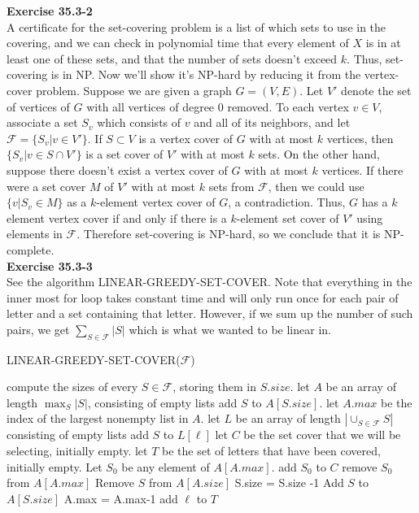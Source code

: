 \documentclass{article}
\begin{document}
\noindent\textbf{Exercise 35.3-2}\\

A certificate for the set-covering problem is a list of which sets to use in the covering, and we can check in polynomial time that every element of $X$ is in at least one of these sets, and that the number of sets doesn't exceed $k$.  Thus, set-covering is in NP.  Now we'll show it's NP-hard by reducing it from the vertex-cover problem.  Suppose we are given a graph $G = (V,E)$.  Let $V'$ denote the set of vertices of $G$ with all vertices of degree 0 removed.  To each vertex $v \in V$, associate a set $S_v$ which consists of $v$ and all of its neighbors, and let $\mathscr{F} = \{ S_v | v \in V'\}$.  If $S \subset V$ is a vertex cover of $G$ with at most $k$ vertices, then $\{S_v | v \in S \cap V'\}$ is a set cover of $V'$ with at most $k$ sets.  On the other hand, suppose there doesn't exist a vertex cover of $G$ with at most $k$ vertices.  If there were a set cover $M$ of $V'$ with at most $k$ sets from $\mathscr{F}$, then we could use $\{v | S_v \in M\}$ as a $k$-element vertex cover of $G$, a contradiction.  Thus, $G$ has a $k$ element vertex cover if and only if there is a $k$-element set cover of $V'$ using elements in $\mathscr{F}$.  Therefore set-covering is NP-hard, so we conclude that it is NP-complete. \\

\noindent\textbf{Exercise 35.3-3}\\

See the algorithm LINEAR-GREEDY-SET-COVER. Note that everything in the inner most for loop takes constant time and will only run once for each pair of letter and a set containing that letter. However, if we sum up the number of such pairs, we get $\sum_{S\in\mathcal{F}} |S|$ which is what we wanted to be linear in.

\begin{algorithm}
\caption{LINEAR-GREEDY-SET-COVER($\mathcal{F}$)}
\begin{algorithmic}
\State compute the sizes of every $S\in \mathcal{F}$, storing them in $S.size$.
\State let $A$ be an array of length $\max_S |S|$, consisting of empty lists
\State add $S$ to $A[S.size]$.
\EndFor
\State let $A.max$ be the index of the largest nonempty list in $A$.
\State let $L$ be an array of length $|\cup_{S\in\mathcal{F}} S|$ consisting of empty lists
\State add $S$ to $L[\ell]$
\EndFor
\EndFor
\State let $C$ be the set cover that we will be selecting, initially empty.
\State let $T$ be the set of letters that have been covered, initially empty.
\State Let $S_0$ be any element of $A[A.max]$.
\State add $S_0$ to $C$
\State remove $S_0$ from $A[A.max]$
\State Remove $S$ from $A[A.size]$
\State S.size = S.size -1
\State Add $S$ to $A[S.size]$
\State A.max = A.max-1
\EndIf
\EndFor
\State add $\ell$ to $T$
\EndFor
\EndWhile
\end{algorithmic}
\end{algorithm}
\end{document}
